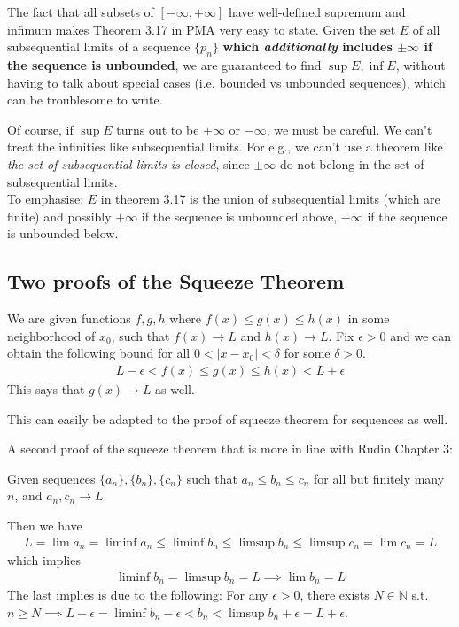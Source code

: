 \documentclass{article}
\begin{document}
The fact that all subsets of $[-\infty, +\infty]$ have well-defined supremum and infimum makes Theorem 3.17 in PMA very easy to state. Given the set $E$ of all subsequential limits of a sequence $\{p_n\}$ \textbf{which \textit{additionally} includes $\pm \infty$ if the sequence is unbounded}, we are guaranteed to find $\sup E, \inf E$, without having to talk about special cases (i.e. bounded vs unbounded sequences), which can be troublesome to write.

Of course, if $\sup E$ turns out to be $+\infty$ or $-\infty$, we must be careful. We can't treat the infinities like subsequential limits. For e.g., we can't use a theorem like \textit{the set of subsequential limits is closed}, since $\pm \infty$ do not belong in the set of subsequential limits.\\
To emphasise: $E$ in theorem 3.17 is the union of subsequential limits (which are finite) and possibly $+\infty$ if the sequence is unbounded above, $-\infty$ if the sequence is unbounded below.


\subsection{Two proofs of the Squeeze Theorem}
We are given functions $f,g,h$ where $f(x)\leq g(x)\leq h(x)$ in some neighborhood of $x_0$, such that $f(x)\rightarrow L$ and $h(x)\rightarrow L$. Fix $\epsilon > 0$ and we can obtain the following bound for all $0 < |x - x_0| < \delta$ for some $\delta > 0$.
\begin{align*}
	L - \epsilon < f(x) \leq g(x) \leq h(x) < L + \epsilon
\end{align*}
This says that $g(x)\rightarrow L$ as well.

This can easily be adapted to the proof of squeeze theorem for sequences as well.

A second proof of the squeeze theorem that is more in line with Rudin Chapter 3:

Given sequences $\{a_n\}, \{b_n\}, \{c_n\}$ such that $a_n\leq b_n\leq c_n$ for all but finitely many $n$, and $a_n, c_n\rightarrow L$.

Then we have \begin{align*}
	L = \lim a_n = \liminf a_n \leq \liminf b_n \leq \limsup b_n \leq \limsup c_n = \lim c_n = L
\end{align*}
which implies
\begin{align*}
	\liminf b_n = \limsup b_n = L \implies \lim b_n = L
\end{align*}
The last implies is due to the following: For any $\epsilon > 0$, there exists $N \in \mathbb{N}$ s.t. $n\geq N\implies L - \epsilon = \liminf b_n - \epsilon < b_n < \limsup b_n + \epsilon = L + \epsilon$.
\end{document}
